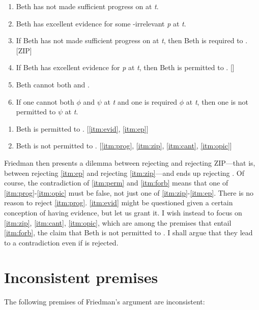 \documentclass[12pt]{article}
\begin{document}
\begin{enumerate}[label=(P\arabic*),ref=P\arabic*]
    \item\label{itm:prog} Beth has not made sufficient progress on  at \textit{t}.
    \item\label{itm:evid} Beth has excellent evidence for some -irrelevant \textit{p} at \textit{t}.
    \item\label{itm:zip} If Beth has not made sufficient progress on  at \textit{t}, then Beth is required to \foc{}. [ZIP]
    \item\label{itm:ep} If Beth has excellent evidence for \textit{p} at \textit{t}, then Beth is permitted to \jud{}. [\ep{}]
    \item\label{itm:cant} Beth cannot both \jud{} and \foc{}.
    \item\label{itm:opic} If one cannot both $\phi$ and $\psi$ at \textit{t} and one is required $\phi$ at \textit{t}, then one is not permitted to $\psi$ at \textit{t}.
\end{enumerate}
\begin{enumerate}[label=(C\arabic*),ref=C\arabic*]
    \item\label{itm:perm} Beth is permitted to \jud{}. [\ref*{itm:evid}, \ref*{itm:ep}]
    \item\label{itm:forb} Beth is not permitted to \jud{}. [\ref*{itm:prog}, \ref*{itm:zip}, \ref*{itm:cant}, \ref*{itm:opic}]
\end{enumerate}
%
\newcommand{\psub}{\ref*{itm:zip}, \ref*{itm:cant}, \ref*{itm:opic}}
%
Friedman then presents a dilemma between rejecting \ep{} and rejecting ZIP---that is, between rejecting \ref*{itm:ep} and rejecting \ref*{itm:zip}---and ends up rejecting \ep{}. Of course, the contradiction of \ref*{itm:perm} and \ref*{itm:forb} means that one of \ref*{itm:prog}-\ref*{itm:opic} must be false, not just one of \ref*{itm:zip}-\ref*{itm:ep}. There is no reason to reject \ref*{itm:prog}. \ref*{itm:evid} might be questioned given a certain conception of having evidence, but let us grant it. I wish instead to focus on \psub{}, which are among the premises that entail \ref*{itm:forb}, the claim that Beth is not permitted to \jud{}. I shall argue that they lead to a contradiction even if \ep{} is rejected.

\section{Inconsistent premises}
The following premises of Friedman's argument are inconsistent:
\end{document}
